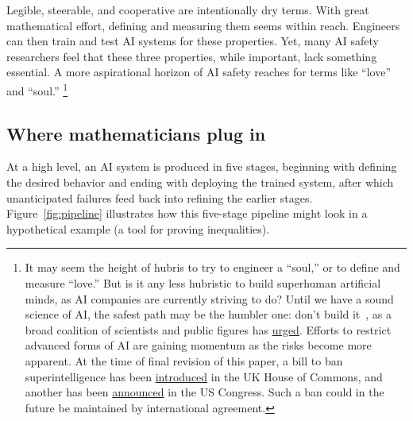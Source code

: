 Legible, steerable, and cooperative are intentionally dry terms. With great mathematical effort, defining and measuring them seems within reach. Engineers can then train and test AI systems for these properties. Yet, many AI safety researchers feel that these three properties, while important, lack something essential. A more aspirational horizon of AI safety reaches for terms like ``love'' and ``soul.''%
\footnote{It may seem the height of hubris to try to engineer a ``soul,'' or to define and measure ``love.'' But is it any less hubristic to build superhuman artificial minds, as AI companies are currently striving to do? Until we have a sound science of AI, the safest path may be the humbler one: don't build it~\cite{yudkowsky2025}, as a broad coalition of scientists and public figures has \href{https://superintelligence-statement.org/}{urged}. Efforts to restrict advanced forms of AI are gaining momentum as the risks become more apparent. At the time of final revision of this paper, a bill to ban superintelligence has been \href{https://bills.parliament.uk/bills/4288}{introduced} in the UK House of Commons, and another has been \href{https://www.sanders.senate.gov/press-releases/news-sanders-casar-introduce-legislation-to-ban-artificial-superintelligence-and-temporarily-pause-advanced-ai-development/}{announced} in the US Congress. Such a ban could in the future be maintained by international agreement.}

\subsection{Where mathematicians plug in}
\label{sec:pipeline}

At a high level, an AI system is produced in five stages, beginning with defining the desired behavior and ending with deploying the trained system, after which unanticipated failures feed back into refining the earlier stages. Figure~\ref{fig:pipeline} illustrates how this five-stage pipeline might look in a hypothetical example (a tool for proving inequalities).

